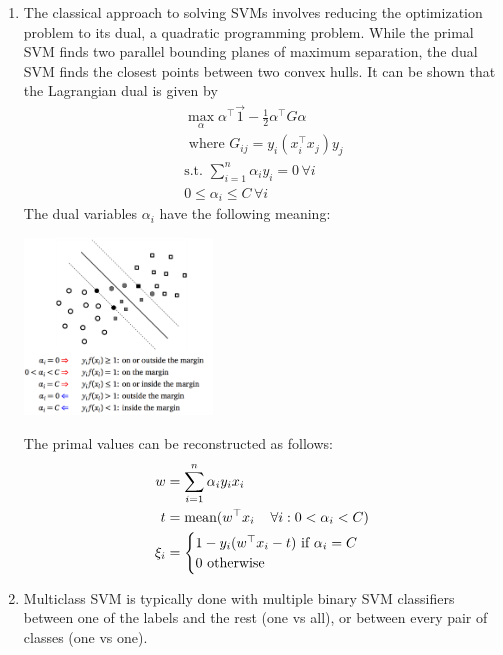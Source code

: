\documentclass[10pt]{article}
\begin{document}
\begin{multicols}{2}
\begin{addmargin}[0.8em]{0.5em}
\begin{enumerate}[label=(\alph*)]
        \item The classical approach to solving SVMs involves reducing the optimization problem to its dual, a quadratic programming problem. While the primal SVM finds two parallel bounding planes of maximum separation, the dual SVM finds the closest points between two convex hulls. It can be shown that the Lagrangian dual is given by
        \begin{align*}
            \max_{\alpha} \alpha^\top \vec{1} - \frac{1}{2} \alpha^\top G \alpha \\
            \text{ where } G_{ij} = y_i(x_i^\top x_j) y_j \\
            \text{s.t. } \sum_{i=1}^{n} \alpha_i y_i = 0 \, \forall i \\
            0 \leq \alpha_i \leq C \, \forall i
        \end{align*}
        The dual variables $\alpha_i$ have the following meaning: 
        \begin{center}
            \includegraphics[width=5cm]{dualsvm.png}
        \end{center}
        The primal values can be reconstructed as follows:
        \begin{align*}
            w &= \sum_{i=1}^{n} \alpha_i y_i x_i \\
            t &= \text{mean}(w^\top x_i \hspace{0.4cm} \forall i: 0 < \alpha_i < C) \\
            \xi_i &= 
            \begin{cases}
            1 - y_i(w^\top x_i - t) \text{ if } \alpha_i = C \\
            0 \text{ otherwise }
            \end{cases}
        \end{align*}
        
        \item Multiclass SVM is typically done with multiple binary SVM classifiers between one of the labels and the rest (one vs all), or between every pair of classes (one vs one).
    \end{enumerate}    
    

\end{addmargin}
\end{multicols}
\end{document}
